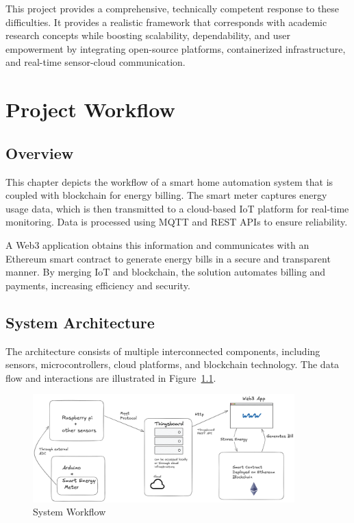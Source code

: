 \documentclass[a4paper,12pt]{report}
\begin{document}
This project provides a comprehensive, technically competent response to these difficulties.  It provides a realistic framework that corresponds with academic research concepts while boosting scalability, dependability, and user empowerment by integrating open-source platforms, containerized infrastructure, and real-time sensor-cloud communication.

\chapter{Project Workflow}

\section{Overview}

This chapter depicts the workflow of a smart home automation system that is coupled with blockchain for energy billing.  The smart meter captures energy usage data, which is then transmitted to a cloud-based IoT platform for real-time monitoring\cite{jain2014raspberry}\cite{chaudhari2017smart}.  Data is processed using MQTT and REST APIs to ensure reliability\cite{Atmoko_2017}.

 A Web3 application obtains this information and communicates with an Ethereum smart contract to generate energy bills in a secure and transparent manner\cite{10.1145/3328833.3328857}\cite{Hu2018BlockchainbasedSC}.  By merging IoT and blockchain, the solution automates billing and payments, increasing efficiency and security.


\section{System Architecture}

The architecture consists of multiple interconnected components, including sensors, microcontrollers, cloud platforms, and blockchain technology. The data flow and interactions are illustrated in Figure~\ref{fig:workflow}.

\begin{figure}[h]
    \centering
    \includegraphics[width=0.9\textwidth]{basicArchitecture.png}
    \caption{System Workflow}
    \label{fig:workflow}
\end{figure}
\end{document}
